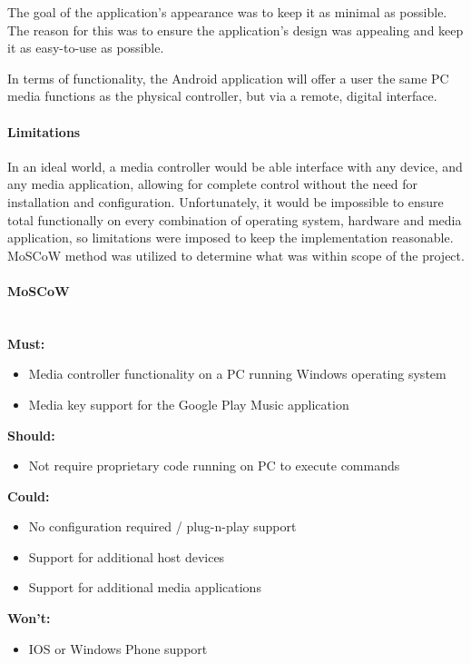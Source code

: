 \documentclass{article}
\begin{document}
				The goal of the application's appearance was to keep it as minimal as possible. The reason for this was to ensure the application's design was appealing and keep it as easy-to-use as possible.
				
				In terms of functionality, the Android application will offer a user the same PC media functions as the physical controller, but via a remote, digital interface.
							
			\paragraph{Limitations}
				In an ideal world, a media controller would be able interface with any device, and any media application, allowing for complete control without the need for installation and configuration. Unfortunately, it would be impossible to ensure total functionally on every combination of operating system, hardware and media application, so limitations were imposed to keep the implementation reasonable. MoSCoW method was utilized to determine what was within scope of the project.

			\begin{minipage}{\textwidth}\label{MoSCoW}
				\paragraph{MoSCoW}
					\noindent\\
					\textbf{Must:}
						\begin{itemize}
							\item Media controller functionality on a PC running Windows operating system
							\item Media key support for the Google Play Music application
						\end{itemize}			
					\textbf{Should:}
						\begin{itemize}
							\item Not require proprietary code running on PC to execute commands
						\end{itemize}
					\textbf{Could:}
						\begin{itemize}
							\item No configuration required / plug-n-play support
							\item Support for additional host devices
							\item Support for additional media applications
						\end{itemize}
					\textbf{Won't:}
						\begin{itemize}
							\item IOS or Windows Phone support
						\end{itemize}
				\end{minipage}
				
\end{document}
